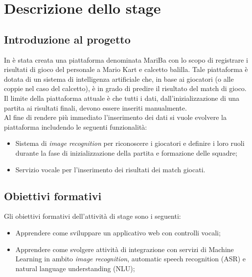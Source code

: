 
\chapter{Descrizione dello stage}
\label{cap:descrizione-stage}

\section{Introduzione al progetto}
In \azienda è stata creata una piattaforma denominata MariBa con lo scopo di registrare i risultati di gioco del personale a Mario Kart e calcetto balilla. Tale piattaforma è dotata di un sistema di intelligenza artificiale che, in base ai giocatori (o alle coppie nel caso del calcetto), è in grado di predire il risultato del match di gioco. Il limite della
piattaforma attuale è che tutti i dati, dall'inizializzazione di una partita ai risultati finali, devono essere inseriti
manualmente. \\

Al fine di rendere più immediato l'inserimento dei dati si vuole evolvere la piattaforma includendo le seguenti funzionalità:
\begin{itemize}
	\item Sistema di \emph{image recognition} per riconoscere i giocatori e definire i loro ruoli durante la fase di inizializzazione della partita
	e formazione delle squadre;
	\item Servizio vocale per l'inserimento dei risultati dei match giocati.
\end{itemize}


\section{Obiettivi formativi}
	Gli obiettivi formativi dell'attività di stage sono i seguenti:
	\begin{itemize}
		\item Apprendere come sviluppare un applicativo web con controlli vocali;
		\item Apprendere come svolgere attività di integrazione con servizi di Machine Learning in ambito \emph{image recognition}, \gls{automatic speech recognition} (ASR) e \gls{natural language understanding} (NLU);
	\end{itemize}

